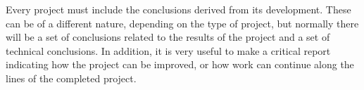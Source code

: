 
\nonzeroparskip Every project must include the conclusions derived from its development. These can be of a different nature, depending on the type of project, but normally there will be a set of conclusions related to the results of the project and a set of technical conclusions.
In addition, it is very useful to make a critical report indicating how the project can be improved, or how work can continue along the lines of the completed project.

